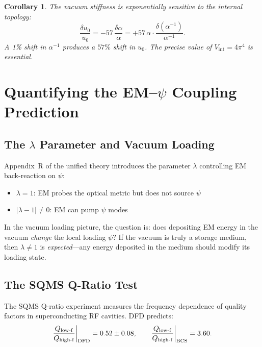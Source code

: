 \documentclass[11pt]{article}
\newcommand{\Vint}{V_{\mathrm{int}}}
\theoremstyle{plain}
\newtheorem{corollary}{Corollary}
\theoremstyle{definition}
\theoremstyle{remark}
\begin{document}
\begin{corollary}
The vacuum stiffness is exponentially sensitive to the internal topology:
\begin{equation}
\frac{\delta u_0}{u_0} = -57\,\frac{\delta\alpha}{\alpha}
= +57\,\alpha \cdot \frac{\delta(\alpha^{-1})}{\alpha^{-1}}.
\end{equation}
A 1\% shift in $\alpha^{-1}$ produces a $57\%$ shift in $u_0$. The
precise value of $\Vint = 4\pi^4$ is essential.
\end{corollary}


\section{Quantifying the EM--$\psi$ Coupling Prediction}
\label{sec:em-psi}

\subsection{The $\lambda$ Parameter and Vacuum Loading}

Appendix~R of the unified theory introduces the parameter $\lambda$
controlling EM back-reaction on $\psi$:
\begin{itemize}
\item $\lambda = 1$: EM probes the optical metric but does not source $\psi$
\item $|\lambda - 1| \neq 0$: EM can pump $\psi$ modes
\end{itemize}

In the vacuum loading picture, the question is: does depositing EM energy
in the vacuum \emph{change} the local loading $\psi$? If the vacuum is
truly a storage medium, then $\lambda \neq 1$ is \emph{expected}---any
energy deposited in the medium should modify its loading state.

\subsection{The SQMS Q-Ratio Test}

The SQMS Q-ratio experiment measures the frequency dependence of quality
factors in superconducting RF cavities. DFD predicts:
\begin{equation}
\frac{Q_{\rm low\text{-}f}}{Q_{\rm high\text{-}f}}\bigg|_{\rm DFD} = 0.52 \pm 0.08,
\qquad
\frac{Q_{\rm low\text{-}f}}{Q_{\rm high\text{-}f}}\bigg|_{\rm BCS} = 3.60.
\label{eq:Q-ratio}
\end{equation}
\end{document}
